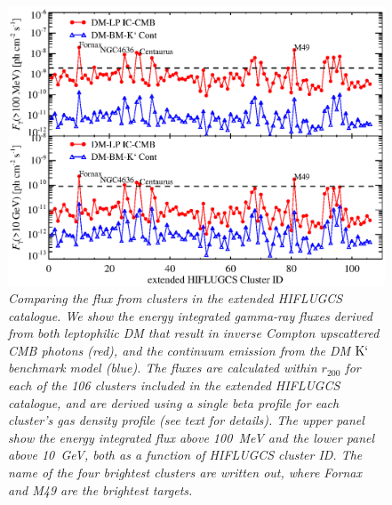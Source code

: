 \documentclass[10pt,aps,pra,reprint,amsmath,amsfonts,amssymb,showpacs]{revtex4-1}
\newcommand{\rmn}{\mathrm}
\newcommand{\Kp}{\rmn{K}`}
\newcommand{\rvir}{r_{200}}
\begin{document}
\begin{figure}%
\begin{minipage}{2.0\columnwidth}
 \includegraphics[width=0.99\columnwidth]{figures/Flux.comp.DM.eps}
\caption{\it Comparing the flux from clusters in the extended HIFLUGCS
  catalogue. We show the energy integrated gamma-ray fluxes derived
  from both leptophilic DM that result in inverse Compton upscattered
  CMB photons (red), and the continuum emission from the DM $\Kp$
  benchmark model (blue). The fluxes are calculated within $\rvir$
  for each of the 106 clusters included in the extended HIFLUGCS
  catalogue, and are derived using a single beta profile for each
  cluster's gas density profile (see text for details). The upper
  panel show the energy integrated flux above 100~MeV and the lower
  panel above 10~GeV, both as a function of HIFLUGCS cluster ID. The
  name of the four brightest clusters are written out, where Fornax
  and M49 are the brightest targets.}
 \label{fig21}
\end{minipage}
\end{figure}
\end{document}
